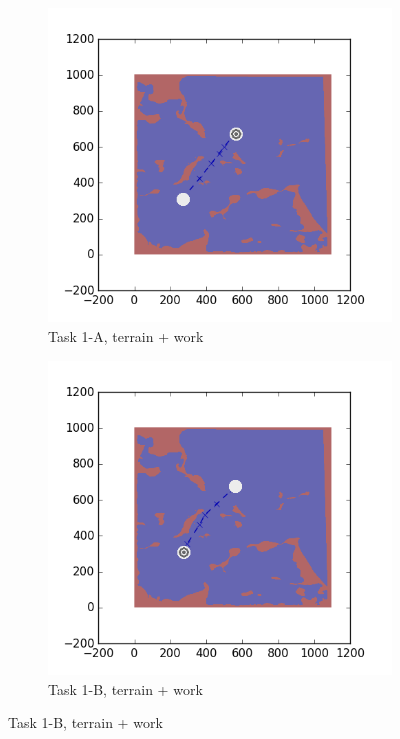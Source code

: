 \documentclass{tamuccthesis}
\begin{document}
\begin{figure}[H]
    \begin{subfigure}[b]{0.4\textwidth}
        \centering
        \includegraphics[width=\textwidth,trim={3cm 3cm 3cm 3cm},clip]{EXP3RG_PathAa_-1_-1_-1_0.png}
        \caption{{\small Task 1-A, terrain + work}}    
        \label{fig:Path_1-A_terrain_work}
    \end{subfigure}
    \hfill
    \begin{subfigure}[b]{0.4\textwidth}  
        \centering 
        \includegraphics[width=\textwidth,trim={3cm 3cm 3cm 3cm},clip]{EXP3RG_PathAb_-1_-1_-1_0.png}
        \caption{{\small Task 1-B, terrain + work}}   
        \label{fig:Path_1-B_terrain_work}
    \end{subfigure}


\end{figure}
\end{document}
